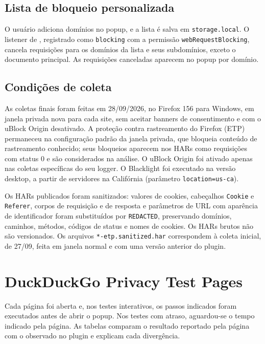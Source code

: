 \documentclass[11pt,a4paper]{article}
\begin{document}
\subsection{Lista de bloqueio personalizada}

O usuário adiciona domínios no popup, e a lista é salva em \texttt{storage.\allowbreak{}local}. O listener de , registrado como \texttt{blocking} com a permissão \texttt{webRequestBlocking}, cancela requisições para os domínios da lista e seus subdomínios, exceto o documento principal. As requisições canceladas aparecem no popup por domínio.

\subsection{Condições de coleta}

As coletas finais foram feitas em 28/09/2026, no Firefox 156 para Windows, em janela privada nova para cada site, sem aceitar banners de consentimento e com o uBlock Origin desativado. A proteção contra rastreamento do Firefox (ETP) permaneceu na configuração padrão da janela privada, que bloqueia conteúdo de rastreamento conhecido; seus bloqueios aparecem nos HARs como requisições com status 0 e são considerados na análise. O uBlock Origin foi ativado apenas nas coletas específicas do seu logger. O Blacklight foi executado na versão desktop, a partir de servidores na Califórnia (parâmetro \texttt{location=us-ca}).

Os HARs publicados foram sanitizados: valores de cookies, cabeçalhos \texttt{Cookie} e \texttt{Referer}, corpos de requisição e de resposta e parâmetros de URL com aparência de identificador foram substituídos por \texttt{REDACTED}, preservando domínios, caminhos, métodos, códigos de status e nomes de cookies. Os HARs brutos não são versionados. Os arquivos \texttt{*-etp.\allowbreak{}sanitized.\allowbreak{}har} correspondem à coleta inicial, de 27/09, feita em janela normal e com uma versão anterior do plugin.

\section{DuckDuckGo Privacy Test Pages}

Cada página foi aberta e, nos testes interativos, os passos indicados foram executados antes de abrir o popup. Nos testes com atraso, aguardou-se o tempo indicado pela página. As tabelas comparam o resultado reportado pela página com o observado no plugin e explicam cada divergência.
\end{document}
